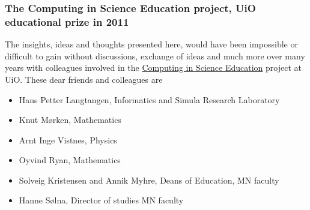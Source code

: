 \documentclass{beamer}
\begin{document}
\begin{frame}
\frametitle{The Computing in Science Education project, UiO educational prize in 2011}

\begin{block}{}
The insights, ideas and thoughts presented here, would have been impossible or difficult to gain without discussions, exchange of ideas and much more over many years with colleagues involved in the \href{{http://www.mn.uio.no/english/about/collaboration/cse/}}{Computing in Science Education} project at UiO. These dear friends and colleagues  are 
\begin{itemize}
\item Hans Petter Langtangen, Informatics and Simula Research Laboratory

\item Knut Mørken, Mathematics

\item Arnt Inge Vistnes, Physics

\item Oyvind Ryan, Mathematics

\item Solveig Kristensen and Annik Myhre, Deans of Education, MN faculty

\item Hanne Sølna, Director of studies MN faculty
\end{itemize}

\noindent
\end{block}
\end{frame}
\end{document}
